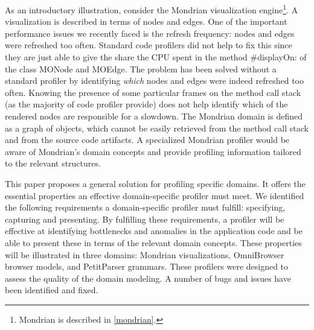 \documentclass[runningheads]{llncs}
\newcommand{\ugh}[1]{\textcolor{red}{\uwave{#1}}} %
\newcommand{\lr}[1]{\nb{Lukas}{orange}{#1}}
\newcommand{\jr}[1]{\nb{Jorge}{cyan}{#1}}
\newcommand{\on}[1]{\nb{Oscar}{olive}{#1}}
\newcommand{\co}[1]{{\sf #1}}
\begin{document}

As an introductory illustration, consider the Mondrian visualization engine\footnote{Mondrian is described in \autoref{mondrian}.}. A visualization is described in terms of nodes and edges. One of the important performance issues we recently faced is the refresh frequency: nodes and edges were refreshed too often.
Standard code profilers did not help to fix this since they are just able to give the share the CPU spent in the method \co{\#displayOn:} of the class \co{MONode} and \co{MOEdge}. The problem has been solved without a standard profiler by identifying \emph{which} nodes and edges were indeed refreshed too often. Knowing the presence of some particular frames on the method call stack (as the majority of code profiler provide) does not help identify which of the rendered nodes are responsible for a slowdown. The Mondrian domain is defined as a graph of objects, which cannot be easily retrieved from the method call stack and from the source code artifacts. A specialized Mondrian profiler would be aware of Mondrian's domain concepts and provide profiling information tailored to the relevant structures.


This paper proposes a general solution for profiling specific domains. It offers the essential properties an effective domain-specific profiler must meet. 
We identified the following requirements a domain-specific profiler must fulfill: specifying, capturing and presenting. \jr{check on comment}
By fulfilling these requirements, a profiler will be effective at identifying bottlenecks and anomalies in the application code and be able to present these in terms of the relevant domain concepts.
\on{?}
These properties will be illustrated in three domains: Mondrian visualizations, OmniBrowser browser models, and PetitParser grammars. These profilers were designed to assess the quality of the domain modeling. A number of bugs and issues have been identified and fixed.
\end{document}
